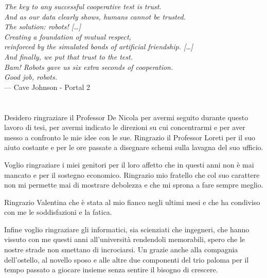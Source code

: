 \pdfbookmark[1]{\acknowledgments}{\acknowledgments}

\begin{flushright}{\slshape
	The key to any successful cooperative test is trust. \\
	And as our data clearly shows, humans cannot be trusted. \\
	The solution: robots! […] \\
	Creating a foundation of mutual respect, \\
	reinforced by the simulated bonds of artificial friendship. […] \\
	And finally, we put that trust to the test. \\
	Bam! Robots gave us six extra seconds of cooperation. \\
	Good job, robots.} \\ \medskip
    --- Cave Johnson - Portal 2
\end{flushright}

\bigskip

\begingroup
\let\clearpage\relax
\let\cleardoublepage\relax
\let\cleardoublepage\relax
\chapter*{\acknowledgments}
Desidero ringraziare il Professor De Nicola per avermi seguito durante questo lavoro di tesi, per avermi indicato le direzioni su cui concentrarmi e per aver messo a confronto le mie idee con le sue. Ringrazio il Professor Loreti per il suo aiuto costante e per le ore passate a disegnare schemi sulla lavagna del suo ufficio.

Voglio ringraziare i miei genitori per il loro affetto che in questi anni non è mai mancato e per il sostegno economico. Ringrazio mio fratello che col suo carattere non mi permette mai di mostrare debolezza e che mi sprona a fare sempre meglio.

Ringrazio Valentina che è stata al mio fianco negli ultimi mesi e che ha condiviso con me le soddisfazioni e la fatica.

Infine voglio ringraziare gli informatici, sia scienziati che ingegneri, che hanno vissuto con me questi anni all'università rendendoli memorabili, spero che le nostre strade non smettano di incrociarsi. Un grazie anche alla compagnia dell'ostello, al novello sposo e alle altre due componenti del trio paloma per il tempo passato a giocare insieme senza sentire il bisogno di crescere.
\endgroup



